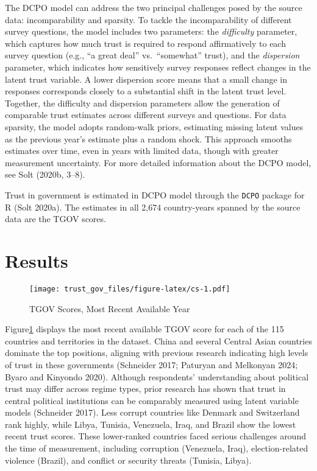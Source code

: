 \documentclass[
  12pt,
]{article}
\begin{document}
The DCPO model can address the two principal challenges posed by the source data: incomparability and sparsity.
To tackle the incomparability of different survey questions, the model includes two parameters:
the \emph{difficulty} parameter, which captures how much trust is required to respond affirmatively to each survey question (e.g., ``a great deal'' vs.~``somewhat'' trust), and the \emph{dispersion} parameter, which indicates how sensitively survey responses reflect changes in the latent trust variable.
A lower dispersion score means that a small change in responses corresponds closely to a substantial shift in the latent trust level.
Together, the difficulty and dispersion parameters allow the generation of comparable trust estimates across different surveys and questions.
For data sparsity, the model adopts random-walk priors, estimating missing latent values as the previous year's estimate plus a random shock. This approach smooths estimates over time, even in years with limited data, though with greater measurement uncertainty.
For more detailed information about the DCPO model, see Solt (2020b, 3--8).

Trust in government is estimated in DCPO model through the \texttt{DCPO} package for R (Solt 2020a).
The estimates in all 2,674 country-years spanned by the source data are the TGOV scores.

\section{Results}\label{results}

\begin{figure}
\centering
\texttt{[image: trust\_gov\_files/figure-latex/cs-1.pdf]}
\caption{\label{fig:cs}TGOV Scores, Most Recent Available Year \label{cs_mry}}
\end{figure}

Figure\nobreakspace{}\ref{cs_mry} displays the most recent available TGOV score for each of the 115 countries and territories in the dataset.
China and several Central Asian countries dominate the top positions, aligning with previous research indicating high levels of trust in these governments (Schneider 2017; Paturyan and Melkonyan 2024; Byaro and Kinyondo 2020).
Although respondents' understanding about political trust may differ across regime types, prior research has shown that trust in central political institutions can be comparably measured using latent variable models (Schneider 2017).
Less corrupt countries like Denmark and Switzerland rank highly, while Libya, Tunisia, Venezuela, Iraq, and Brazil show the lowest recent trust scores. These lower-ranked countries faced serious challenges around the time of measurement, including corruption (Venezuela, Iraq), election-related violence (Brazil), and conflict or security threats (Tunisia, Libya).
\end{document}
